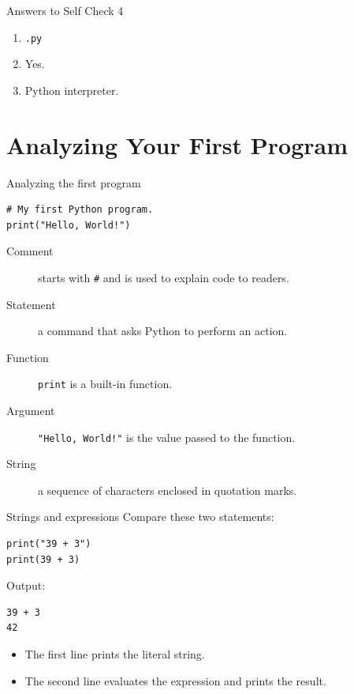 \documentclass[aspectratio=169,10pt]{beamer}
\begin{document}
\begin{frame}{Answers to Self Check 4}
\begin{enumerate}
  \item \texttt{.py}
  \item Yes.
  \item Python interpreter.
\end{enumerate}
\end{frame}

\section{Analyzing Your First Program}

\begin{frame}[fragile]{Analyzing the first program}
\begin{lstlisting}
# My first Python program.
print("Hello, World!")
\end{lstlisting}

\begin{description}
  \item[Comment] starts with \texttt{\#} and is used to explain code to readers.
  \item[Statement] a command that asks Python to perform an action.
  \item[Function] \texttt{print} is a built-in function.
  \item[Argument] \texttt{"Hello, World!"} is the value passed to the function.
  \item[String] a sequence of characters enclosed in quotation marks.
\end{description}
\end{frame}

\begin{frame}[fragile]{Strings and expressions}
Compare these two statements:

\begin{lstlisting}
print("39 + 3")
print(39 + 3)
\end{lstlisting}

Output:

\begin{lstlisting}
39 + 3
42
\end{lstlisting}

\begin{itemize}
  \item The first line prints the literal string.
  \item The second line evaluates the expression and prints the result.
\end{itemize}
\end{frame}
\end{document}
